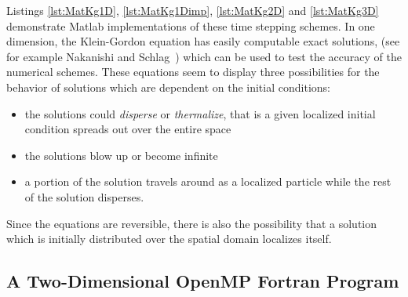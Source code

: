 Listings \ref{lst:MatKg1D}, \ref{lst:MatKg1Dimp}, \ref{lst:MatKg2D} and \ref{lst:MatKg3D} demonstrate Matlab implementations of these time stepping schemes. In one dimension, the Klein-Gordon equation has easily computable exact solutions, (see for example Nakanishi and Schlag~\cite[p.6]{NakSch11})  which can be used to test the accuracy of the numerical schemes. These equations seem to display three possibilities for the behavior of solutions which are dependent on the initial conditions:
\begin{itemize}
\item the solutions could \emph{disperse} or \emph{thermalize}, that is a given localized initial condition spreads out over the entire space 
\item the solutions blow up or become infinite
\item a portion of the solution travels around as a localized particle while the rest of the solution disperses.
\end{itemize}
Since the equations are reversible, there is also the possibility that a solution which is initially distributed over the spatial domain localizes itself. 









\subsection{A Two-Dimensional OpenMP Fortran Program}

